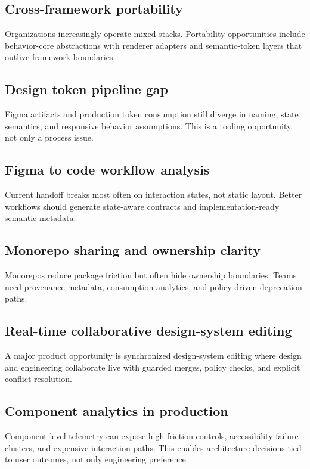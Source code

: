 \documentclass[11pt,twoside,a4paper]{article}
\begin{document}
\subsection{Cross-framework portability}
Organizations increasingly operate mixed stacks. Portability opportunities include behavior-core abstractions with renderer adapters and semantic-token layers that outlive framework boundaries.

\subsection{Design token pipeline gap}
Figma artifacts and production token consumption still diverge in naming, state semantics, and responsive behavior assumptions. This is a tooling opportunity, not only a process issue.

\subsection{Figma to code workflow analysis}
Current handoff breaks most often on interaction states, not static layout. Better workflows should generate state-aware contracts and implementation-ready semantic metadata.

\subsection{Monorepo sharing and ownership clarity}
Monorepos reduce package friction but often hide ownership boundaries. Teams need provenance metadata, consumption analytics, and policy-driven deprecation paths.

\subsection{Real-time collaborative design-system editing}
A major product opportunity is synchronized design-system editing where design and engineering collaborate live with guarded merges, policy checks, and explicit conflict resolution.

\subsection{Component analytics in production}
Component-level telemetry can expose high-friction controls, accessibility failure clusters, and expensive interaction paths. This enables architecture decisions tied to user outcomes, not only engineering preference.
\end{document}

